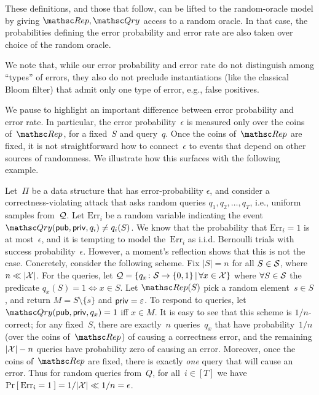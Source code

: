 These definitions, and those that follow, can be lifted to the random-oracle
model by giving $\Rep, \Qry$ access to a random oracle. In that
case, the probabilities defining the error probability and error
rate are also taken over choice of the random oracle.

We note that, while our error probability and error rate do not
distinguish among ``types'' of errors, they also do not preclude
instantiations (like the classical Bloom filter) that admit only one
type of error, e.g., false positives.


\def\bin{{\sf Bin}}
We pause to highlight an important
difference between error probability and error rate.  In particular,
the error probability~$\epsilon$ is measured only over the coins
of~$\Rep$, for a fixed~$S$ and query~$q$. Once the coins of~$\Rep$
are fixed, it is not straightforward how to connect~$\epsilon$ to
events that depend on other sources of randomness.   We illustrate how
this surfaces with the following example.

Let~$\Pi$ be a data structure that has error-probability $\epsilon$,
and consider a correctness-violating attack that asks random
queries $q_1,q_2,\ldots,q_T$, i.e., uniform samples from~${\cal Q}$.
Let $\mathrm{Err}_i$ be a random variable indicating the event
$\Qry(\pubaux,\privaux,q_i)\neq q_i(S)$.  We know that the probability
that $\mathrm{Err}_i=1$ is at most~$\epsilon$, and it is tempting to
model the~$\mathrm{Err}_i$ as i.i.d. Bernoulli trials with success
probability~$\epsilon$. However, a moment's reflection shows that
this is not the case.  Concretely, consider the following scheme.
Fix $|S|=n$ for all $S \in {\cal S}$, where $n \ll |{\cal X}|$. For the
queries, let ${\cal Q} = \{q_x\colon {\cal S} \to \{0,1\} \,|\, \forall x
\in {\cal X}\}$ where $\forall S \in {\cal S}$ the predicate $q_x(S)=1
\Leftrightarrow x \in S$.  Let $\Rep(S)$ pick a random element~$s
\in S$, and return $M = S \setminus \{s\}$ and ${\sf priv} =
\varepsilon$.  To respond to queries,
let~$\Qry(\pubaux,\privaux,q_x)=1$ iff $x \in M$.  It is easy to see
that this scheme is $1/n$-correct; for any fixed~$S$, there are
exactly~$n$ queries~$q_x$ that have probability~$1/n$  (over the
coins of~$\Rep$) of causing a correctness error, and the remaining
$|{\cal X}|-n$ queries have probability zero of causing an error.
Moreover, once the coins of~$\Rep$ are fixed, there is exactly
\emph{one} query that will cause an error.  Thus for random queries
from~$Q$, for all~$i\in[T]$ we have
$\Pr\left[\: \mathrm{Err}_i=1 \:\right]=1/|{\cal X}| \ll 1/n = \epsilon$.


